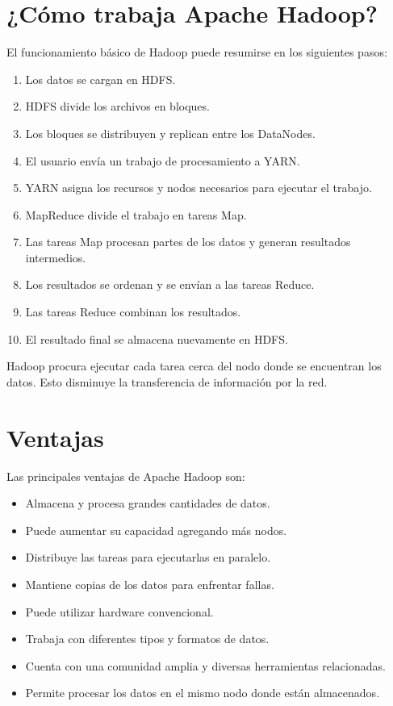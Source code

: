 \section{¿Cómo trabaja Apache Hadoop?}

El funcionamiento básico de Hadoop puede resumirse en los siguientes pasos:

\begin{enumerate}
    \item Los datos se cargan en HDFS.
    \item HDFS divide los archivos en bloques.
    \item Los bloques se distribuyen y replican entre los DataNodes.
    \item El usuario envía un trabajo de procesamiento a YARN.
    \item YARN asigna los recursos y nodos necesarios para ejecutar el trabajo.
    \item MapReduce divide el trabajo en tareas Map.
    \item Las tareas Map procesan partes de los datos y generan resultados
    intermedios.
    \item Los resultados se ordenan y se envían a las tareas Reduce.
    \item Las tareas Reduce combinan los resultados.
    \item El resultado final se almacena nuevamente en HDFS.
\end{enumerate}

Hadoop procura ejecutar cada tarea cerca del nodo donde se encuentran los
datos. Esto disminuye la transferencia de información por la red.

\section{Ventajas}

Las principales ventajas de Apache Hadoop son:

\begin{itemize}
    \item Almacena y procesa grandes cantidades de datos.
    \item Puede aumentar su capacidad agregando más nodos.
    \item Distribuye las tareas para ejecutarlas en paralelo.
    \item Mantiene copias de los datos para enfrentar fallas.
    \item Puede utilizar hardware convencional.
    \item Trabaja con diferentes tipos y formatos de datos.
    \item Cuenta con una comunidad amplia y diversas herramientas relacionadas.
    \item Permite procesar los datos en el mismo nodo donde están almacenados.
\end{itemize}

